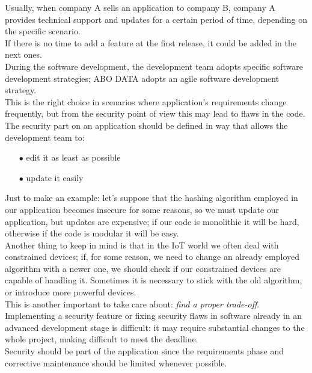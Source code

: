 \documentclass[12pt]{report}
\begin{document}
{Usually, when company A sells an application to company B, company A provides technical support and updates for a certain period of time, depending on the specific scenario.\\
If there is no time to add a feature at the first release, it could be added in the next ones.\\

During the software development, the development team adopts specific software development strategies; ABO DATA adopts an agile software development strategy.\\ 
This is the right choice in scenarios where application's requirements change frequently, but from the security point of view this may lead to flaws in the code.\\

The security part on an application should be defined in way that allows the development team to:

\begin{itemize}
\setlength{\itemindent}{+4mm}
\item[$\bullet$] edit it as least as possible
\item[$\bullet$] update it easily
\end{itemize}

Just to make an example:  let's suppose that the hashing algorithm employed in our application becomes insecure for some reasons, so we must update our application, but updates are expensive; if our code is monolithic it will be hard, otherwise if the code is modular it will be easy.\\

Another thing to keep in mind is that in the IoT world we often deal with constrained devices; if, for some reason, we need to change an already employed algorithm with a newer one, we should check if our constrained devices are capable of handling it. Sometimes it is necessary to stick with the old algorithm, or introduce more powerful devices.\\
This is another important to take care about: \emph{find a proper trade-off}.\\

Implementing a security feature or fixing security flaws in software already in an advanced development stage is difficult: it may require substantial changes to the whole project, making difficult to meet the deadline.\\
Security should be part of the application since the requirements phase and corrective maintenance should be limited whenever possible.\\

}
\end{document}
